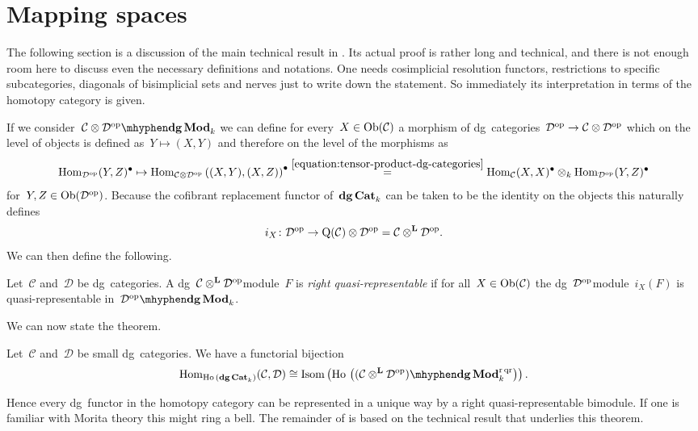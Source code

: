 \section{Mapping spaces}
The following section is a discussion of the main technical result in \cite{toen}. Its actual proof is rather long and technical, and there is not enough room here to discuss even the necessary definitions and notations. One needs cosimplicial resolution functors, restrictions to specific subcategories, diagonals of bisimplicial sets and nerves just to write down the statement. So immediately its interpretation in terms of the homotopy category is given.

If we consider~$\dgMod{\mathcal{C}\otimes\mathcal{D}^\opp}_k$ we can define for every~$X\in\mathrm{Ob}(\mathcal{C})$ a morphism of dg~categories~$\mathcal{D}^{\mathrm{op}}\to\mathcal{C}\otimes\mathcal{D}^{\mathrm{op}}$ which on the level of objects is defined as~$Y\mapsto(X,Y)$ and therefore on the level of the morphisms as
\begin{equation}
  \mathrm{Hom}_{\mathcal{D}^{\mathrm{op}}}(Y,Z)^\bullet\mapsto\mathrm{Hom}_{\mathcal{C}\otimes\mathcal{D}^{\mathrm{op}}}\left( (X,Y),(X,Z) \right)^\bullet\overset{\eqref{equation:tensor-product-dg-categories}}{=}\mathrm{Hom}_{\mathcal{C}}(X,X)^\bullet\otimes_k\mathrm{Hom}_{\mathcal{D}^{\mathrm{op}}}(Y,Z)^\bullet
\end{equation}
for~$Y,Z\in\mathrm{Ob}(\mathcal{D}^{\mathrm{op}})$. Because the cofibrant replacement functor of~$\mathbf{dg\,Cat}_k$ can be taken to be the identity on the objects \cite[proposition 2.3]{toen} this naturally defines
\begin{equation}
  i_X\colon\mathcal{D}^{\mathrm{op}}\to\operatorname{Q}(\mathcal{C})\otimes\mathcal{D}^{\mathrm{op}}=\mathcal{C}\otimes^{\mathbf{L}}\mathcal{D}^{\mathrm{op}}.
\end{equation}
We can then define the following.
\begin{definition}
  Let~$\mathcal{C}$ and~$\mathcal{D}$ be dg~categories. A dg~$\mathcal{C}\otimes^{\mathbf{L}}\mathcal{D}^{\mathrm{op}}$\dash module~$F$ is \emph{right quasi-representable} if for all~$X\in\mathrm{Ob}(\mathcal{C})$ the dg~$\mathcal{D}^{\mathrm{op}}$\dash module~$i_X(F)$ is quasi-representable in~$\dgMod{\mathcal{D}^\opp}_k$.
\end{definition}
We can now state the theorem.
\begin{theorem}
  \label{theorem:fundamental-bijection}
  Let~$\mathcal{C}$ and~$\mathcal{D}$ be small dg~categories. We have a functorial bijection
  \begin{equation}
    \label{equation:fundamental-bijection}
    \Hom_{\Ho(\dgCat_k)}(\mathcal{C},\mathcal{D})\cong\Isom\left( \Ho\left( \dgMod{(\mathcal{C}\LLLotimes\mathcal{D}^\opp)}_k^\rqr \right) \right).
  \end{equation}
\end{theorem}
Hence every dg~functor in the homotopy category can be represented in a unique way by a right quasi-representable bimodule. If one is familiar with Morita theory this might ring a bell. The remainder of \cite{toen} is based on the technical result that underlies this theorem.  



